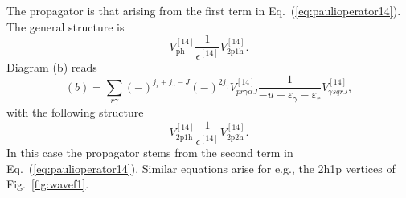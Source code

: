 The propagator is that arising
from the first term in Eq.\ (\ref{eq:paulioperator14}).
The  general structure is
\begin{equation}
     V_{\mathrm{ph}}^{[14]}
     \frac{1}{\epsilon^{[14]}}
     V_{\mathrm{2p1h}}^{[14]}.
     \label{eq:2p1hseca}
\end{equation}
Diagram (b) reads
\begin{equation}
      (b)=\sum_{r\gamma}(-)^{j_r+j_{\gamma}-J}
      (-)^{2j_{\gamma}}
      V^{[14]}_{pr\gamma\alpha J}
      \frac{1}{-u+\varepsilon_{\gamma}-
                \varepsilon_r} V^{[14]}_{\gamma sqr J},
       \label{eq:2p1hb}
\end{equation}
with the following structure
\begin{equation}
     V_{\mathrm{2p1h}}^{[14]}
     \frac{1}{\epsilon^{[14]}}
     V_{\mathrm{2p2h}}^{[14]}.
     \label{eq:2p1hsecb}
\end{equation}
In this case the propagator stems from the second term
in Eq.\ (\ref{eq:paulioperator14}).
Similar equations arise for e.g.,  the 2h1p
vertices of Fig.\ \ref{fig:wavef1}. 

